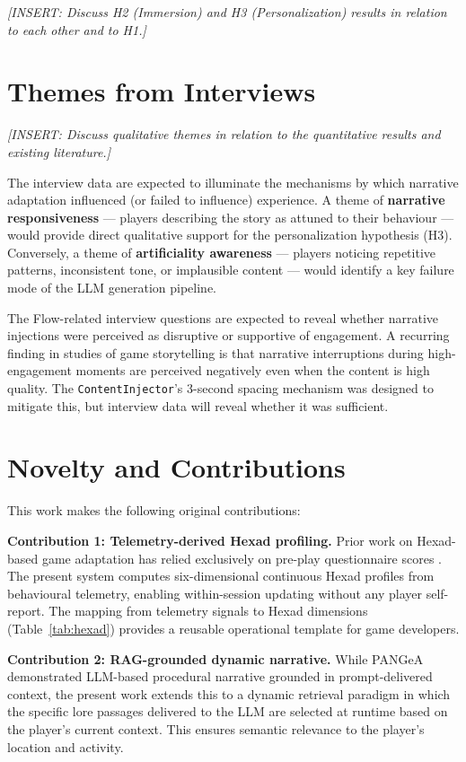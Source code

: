 \documentclass[12pt,a4paper]{report}
\begin{document}
\textit{[INSERT: Discuss H2 (Immersion) and H3 (Personalization) results in relation to each other and to H1.]}

\section{Themes from Interviews}

\textit{[INSERT: Discuss qualitative themes in relation to the quantitative results and existing literature.]}

The interview data are expected to illuminate the mechanisms by which narrative adaptation influenced (or failed to influence) experience. A theme of \textbf{narrative responsiveness} --- players describing the story as attuned to their behaviour --- would provide direct qualitative support for the personalization hypothesis (H3). Conversely, a theme of \textbf{artificiality awareness} --- players noticing repetitive patterns, inconsistent tone, or implausible content --- would identify a key failure mode of the LLM generation pipeline.

The Flow-related interview questions are expected to reveal whether narrative injections were perceived as disruptive or supportive of engagement. A recurring finding in studies of game storytelling is that narrative interruptions during high-engagement moments are perceived negatively even when the content is high quality. The \texttt{ContentInjector}'s 3-second spacing mechanism was designed to mitigate this, but interview data will reveal whether it was sufficient.

\section{Novelty and Contributions}

This work makes the following original contributions:

\textbf{Contribution 1: Telemetry-derived Hexad profiling.} Prior work on Hexad-based game adaptation has relied exclusively on pre-play questionnaire scores \citep{tondello2016hexad}. The present system computes six-dimensional continuous Hexad profiles from behavioural telemetry, enabling within-session updating without any player self-report. The mapping from telemetry signals to Hexad dimensions (Table~\ref{tab:hexad}) provides a reusable operational template for game developers.

\textbf{Contribution 2: RAG-grounded dynamic narrative.} While PANGeA \citep{todd2024pangea} demonstrated LLM-based procedural narrative grounded in prompt-delivered context, the present work extends this to a dynamic retrieval paradigm in which the specific lore passages delivered to the LLM are selected at runtime based on the player's current context. This ensures semantic relevance to the player's location and activity.
\end{document}
